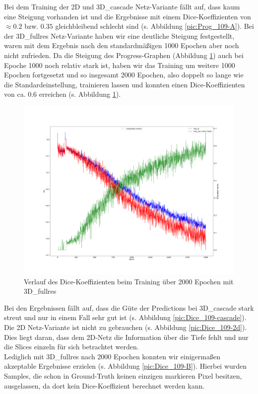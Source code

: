 Bei dem Training der 2D und 3D\_cascade Netz-Variante fällt auf, dass kaum eine Steigung vorhanden ist und die Ergebnisse mit einem Dice-Koeffizienten von $\approx 0.2$ bzw. $0.35$ gleichbleibend schlecht sind (s. Abbildung \ref{pic:Prog_109-A}).
Bei der 3D\_fullres Netz-Variante haben wir eine deutliche Steigung festgestellt, waren mit dem Ergebnis nach den standardmäßigen 1000 Epochen aber noch nicht zufrieden. Da die Steigung des Progress-Graphen (Abbildung \ref{pic:Prog_109-B}) auch bei Epoche 1000 noch relativ stark ist, haben wir das Training um weitere 1000 Epochen fortgesetzt und so insgesamt 2000 Epochen, also doppelt so lange wie die Standardeinstellung, trainieren lassen und konnten einen Dice-Koeffizienten von ca. 0.6 erreichen (s. Abbildung \ref{pic:Prog_109-B}).

\begin{figure}[H]
\includegraphics[width=\textwidth]{Pictures/nnUnet/Praxis/Task109-CT/progress_109-CT_3d_fullres.png}
\caption{Verlauf des Dice-Koeffizienten beim Training über 2000 Epochen mit 3D\_fullres}
\label{pic:Prog_109-B}
\end{figure}

Bei den Ergebnissen fällt auf, dass die Güte der Predictions bei 3D\_cascade stark streut und  nur in einem Fall sehr gut ist (s. Abbildung \ref{pic:Dice_109-cascade}). Die 2D Netz-Variante ist nicht zu gebrauchen (s. Abbildung \ref{pic:Dice_109-2d}). Dies liegt daran, dass dem 2D-Netz die Information über die Tiefe fehlt und nur die Slices einzeln für sich betrachtet werden.\\
Lediglich mit 3D\_fullres nach 2000 Epochen konnten wir einigermaßen akzeptable Ergebnisse erzielen (s. Abbildung \ref{pic:Dice_109-B}). Hierbei wurden Samples, die schon in Ground-Truth keinen einzigen markieren Pixel besitzen, ausgelassen, da dort kein Dice-Koeffizient berechnet werden kann.




